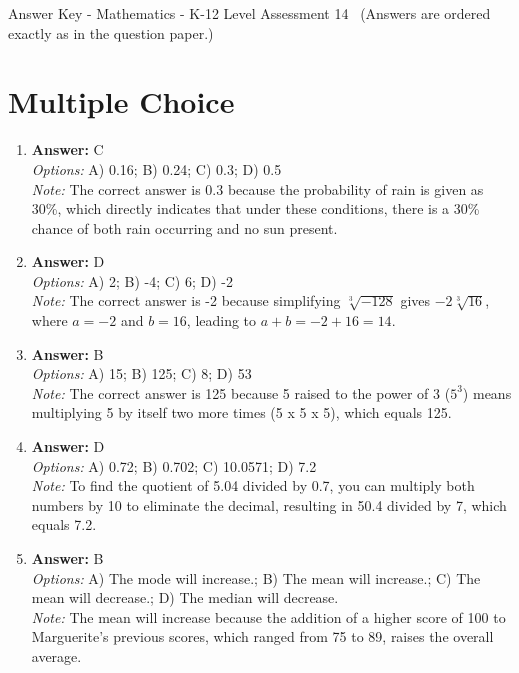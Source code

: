 \documentclass[12pt]{article}
\begin{document}
\begin{center}
Answer Key - Mathematics - K-12 Level Assessment 14 \
\small (Answers are ordered exactly as in the question paper.)
\end{center}

\section*{Multiple Choice}
\begin{enumerate}[label=\arabic*.]
\item \textbf{Answer:} C
\\ \textit{Options:} A) 0.16; B) 0.24; C) 0.3; D) 0.5
\\ \textit{Note:} The correct answer is 0.3 because the probability of rain is given as 30\%, which directly indicates that under these conditions, there is a 30\% chance of both rain occurring and no sun present.
\item \textbf{Answer:} D
\\ \textit{Options:} A) 2; B) -4; C) 6; D) -2
\\ \textit{Note:} The correct answer is -2 because simplifying $\sqrt[3]{-128}$ gives $-2\sqrt[3]{16}$, where $a = -2$ and $b = 16$, leading to $a + b = -2 + 16 = 14$.
\item \textbf{Answer:} B
\\ \textit{Options:} A) 15; B) 125; C) 8; D) 53
\\ \textit{Note:} The correct answer is 125 because 5 raised to the power of 3 ($5^3$) means multiplying 5 by itself two more times (5 x 5 x 5), which equals 125.
\item \textbf{Answer:} D
\\ \textit{Options:} A) 0.72; B) 0.702; C) 10.0571; D) 7.2
\\ \textit{Note:} To find the quotient of 5.04 divided by 0.7, you can multiply both numbers by 10 to eliminate the decimal, resulting in 50.4 divided by 7, which equals 7.2.
\item \textbf{Answer:} B
\\ \textit{Options:} A) The mode will increase.; B) The mean will increase.; C) The mean will decrease.; D) The median will decrease.
\\ \textit{Note:} The mean will increase because the addition of a higher score of 100 to Marguerite's previous scores, which ranged from 75 to 89, raises the overall average.
\end{enumerate}
\end{document}
